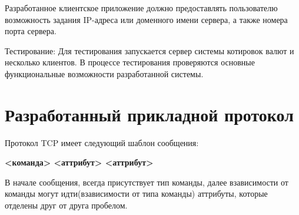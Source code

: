 \documentclass[a4paper,14pt]{article}
\begin{document}
Разработанное клиентское приложение должно предоставлять пользователю возможность задания IP-адреса или доменного имени сервера, а также номера порта сервера.

Тестирование:
Для тестирования запускается сервер системы котировок валют и несколько клиентов. В процессе тестирования проверяются основные функциональные возможности разработанной системы.

\section{Разработанный прикладной протокол}
Протокол TCP имеет следующий шаблон сообщения:
\begin{center}
	\textbf{<команда> <аттрибут> <аттрибут>}
\end{center}
В начале сообщения, всегда присутствует тип команды, далее взависимости от команды могут идти(взависимости от типа команды) аттрибуты, которые отделены друг от друга пробелом.
\end{document}
